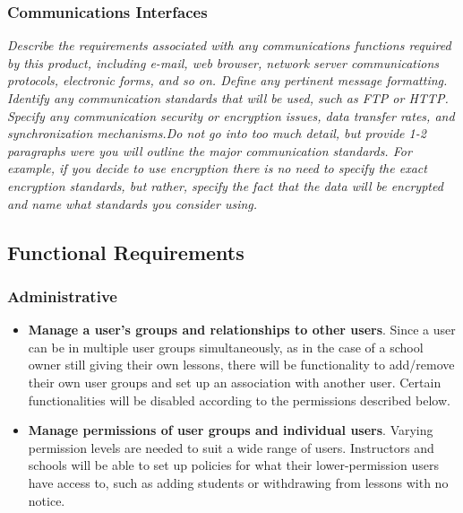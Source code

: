         \subsubsection{Communications Interfaces}\label{sec:communications-interfaces}
            \emph{Describe the requirements associated with any communications functions required by this product, including e-mail, web browser, network server communications protocols, electronic forms, and so on. Define any pertinent message formatting. Identify any communication standards that will be used, such as FTP or HTTP. Specify any communication security or encryption issues, data transfer rates, and synchronization mechanisms.\gnl Do not go into too much detail, but provide 1-2 paragraphs were you will outline the major communication standards. For example, if you decide to use encryption there is no need to specify the exact encryption standards, but rather, specify the fact that the data will be encrypted and name what standards you consider using.}
    \subsection{Functional Requirements}\label{sec:functional-requirements}
        \subsubsection{Administrative}\label{sec:administrative-functions}
            \begin{itemize}
                \item \textbf{Manage a user's groups and relationships to other users}. Since a user can be in multiple user groups simultaneously, as in the case of a school owner still giving their own lessons, there will be functionality to add/remove their own user groups and set up an association with another user. Certain functionalities will be disabled according to the permissions described below.
                \item \textbf{Manage permissions of user groups and individual users}. Varying permission levels are needed to suit a wide range of users. Instructors and schools will be able to set up policies for what their lower-permission users have access to, such as adding students or withdrawing from lessons with no notice.
            \end{itemize}
